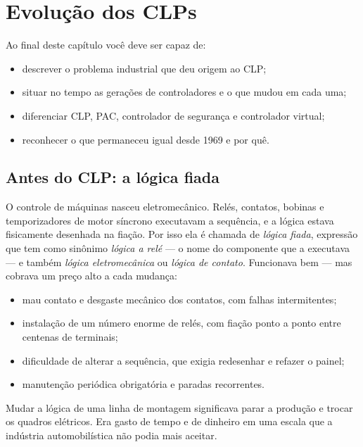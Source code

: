 \chapter{Evolução dos CLPs}
\label{cap:evolucao}

\begin{objetivos}
Ao final deste capítulo você deve ser capaz de:
\begin{itemize}
  \item descrever o problema industrial que deu origem ao CLP;
  \item situar no tempo as gerações de controladores e o que mudou em cada uma;
  \item diferenciar CLP, PAC, controlador de segurança e controlador virtual;
  \item reconhecer o que permaneceu igual desde 1969 e por quê.
\end{itemize}
\end{objetivos}

\section{Antes do CLP: a lógica fiada}

O controle de máquinas nasceu eletromecânico. Relés, contatos, bobinas e temporizadores de motor
síncrono executavam a sequência, e a lógica estava fisicamente desenhada na fiação. Por isso ela é
chamada de \emph{lógica fiada}, expressão que tem como sinônimo \emph{lógica a relé} --- o nome do
componente que a executava --- e também \emph{lógica eletromecânica} ou \emph{lógica de contato}.
Funcionava bem --- mas cobrava um preço alto a cada mudança:

\begin{itemize}
  \item mau contato e desgaste mecânico dos contatos, com falhas intermitentes;
  \item instalação de um número enorme de relés, com fiação ponto a ponto entre centenas de
        terminais;
  \item dificuldade de alterar a sequência, que exigia redesenhar e refazer o painel;
  \item manutenção periódica obrigatória e paradas recorrentes.
\end{itemize}

Mudar a lógica de uma linha de montagem significava parar a produção e trocar os quadros
elétricos. Era gasto de tempo e de dinheiro em uma escala que a indústria automobilística não
podia mais aceitar.

